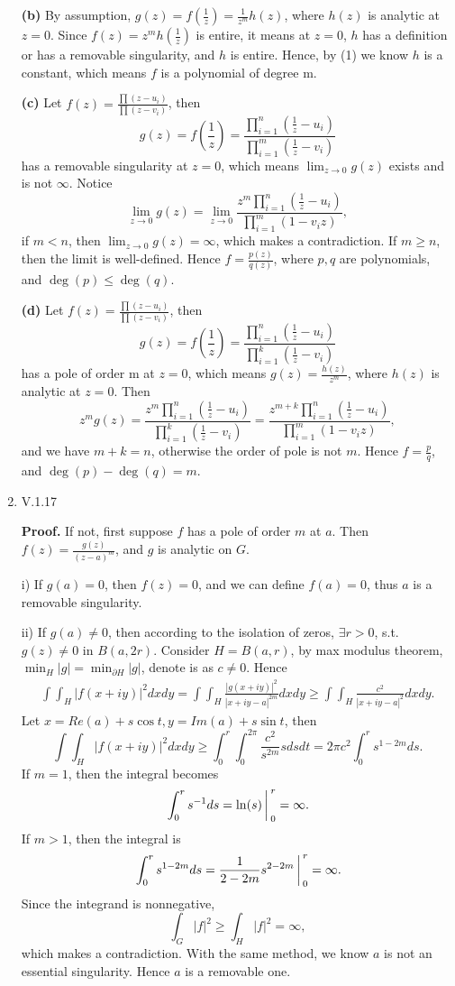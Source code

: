 \documentclass{article}%
\begin{document}
\begin{enumerate}
\textbf{(b)} By assumption, $g(z) = f(\frac{1}{z}) = \frac{1}{z^m}h(z)$, where $h(z)$ is analytic at $z = 0$. Since $f(z) = z^{m}h(\frac{1}{z})$ is entire, it means at $z = 0$, $h$ has a definition or has a removable singularity, and $h$ is entire. Hence, by (1) we know $h$ is a constant, which means $f$ is a polynomial of degree m.

\textbf{(c)} Let $f(z) = \frac{\prod (z-u_i)}{\prod (z-v_i)}$, then 
$$
g(z) = f(\frac{1}{z}) = \frac{\prod_{i=1}^{n} (\frac{1}{z}-u_i)}{\prod_{i=1}^{m} (\frac{1}{z}-v_i)}
$$
has a removable singularity at $z = 0$, which means $\lim_{z\to 0}g(z) $ exists and is not $\infty$. Notice
$$
\lim_{z \to 0}g(z) = \lim_{z\to 0}\frac{z^m\prod_{i=1}^{n} (\frac{1}{z}-u_i)}{\prod_{i=1}^{m} (1-v_iz)},
$$
if $m < n$, then $\lim_{z\to 0} g(z) = \infty$, which makes a contradiction. If $m \ge n$, then the limit is well-defined. Hence $f = \frac{p(z)}{q(z)}$, where $p, q$ are polynomials, and $\deg(p) \le \deg(q)$.

\textbf{(d)} Let $f(z) = \frac{\prod (z-u_i)}{\prod (z-v_i)}$, then 
$$
g(z) = f(\frac{1}{z}) = \frac{\prod_{i=1}^{n} (\frac{1}{z}-u_i)}{\prod_{i=1}^{k} (\frac{1}{z}-v_i)}
$$
has a pole of order m at $z = 0$, which means $g(z) = \frac{h(z)}{z^m}$, where $h(z)$ is analytic at $z = 0$. Then
$$
z^mg(z) = \frac{z^m\prod_{i=1}^{n} (\frac{1}{z}-u_i)}{\prod_{i=1}^{k} (\frac{1}{z}-v_i)} = \frac{z^{m+k}\prod_{i=1}^{n} (\frac{1}{z}-u_i)}{\prod_{i=1}^{m} (1-v_iz)},
$$
and we have $m+k = n$, otherwise the order of pole is not $m$. Hence $f = \frac{p}{q}$, and $\deg(p)-\deg(q) = m$.

\item V.1.17

\textbf{Proof.} If not, first suppose $f$ has a pole of order $m$ at $a$. Then $f(z) = \frac{g(z)}{(z-a)^m}$, and $g$ is analytic on $G$. 

i) If $g(a) = 0$, then $f(z) = 0$, and we can define $f(a) = 0$, thus $a$ is a removable singularity.

ii) If $g(a)\ne 0$, then according to the isolation of zeros, $\exists r > 0$, s.t. $g(z) \ne 0$ in $B(a, 2r)$. Consider $H = B(a, r)$, by max modulus theorem, $\min_{H}|g| = \min_{\partial H}|g|$, denote is as $c \ne 0$. Hence
$$
\begin{aligned}
\int\int_{H}|f(x+iy)|^2 dxdy = \int\int_{H}\frac{|g(x+iy)|^2}{|x+iy-a|^{2m}}dxdy \ge \int\int_{H}\frac{c^2}{|x+iy-a|^2}dxdy.
\end{aligned}
$$
Let $x = Re(a)+s\cos t, y = Im(a)+s\sin t $, then
$$
\int\int_{H}|f(x+iy)|^2 dxdy \ge \int_{0}^{r}\int_{0}^{2\pi}\frac{c^2}{s^{2m}}sdsdt = 2\pi c^2\int_{0}^{r}s^{1-2m}ds.
$$
If $m = 1$, then the integral becomes
$$
\left.\int_{0}^{r} s^{-1}ds = \ln(s)\right\arrowvert_{0}^{r} = \infty.
$$
If $m > 1$, then the integral is
$$
\left.\int_{0}^{r} s^{1-2m} ds = \frac{1}{2-2m}s^{2-2m}\right\arrowvert_{0}^r = \infty.
$$
Since the integrand is nonnegative,
$$
\int_{G} |f|^2 \ge \int_{H} |f|^2 = \infty,
$$
which makes a contradiction. With the same method, we know $a$ is not an essential singularity. Hence $a$ is a removable one.


\end{enumerate}
\end{document}
